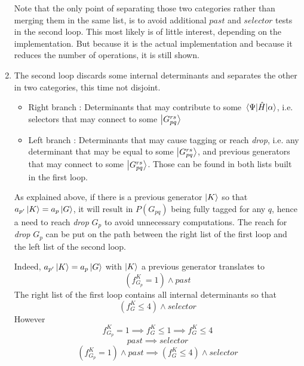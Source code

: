 \documentclass[./thesis.tex]{subfiles}
\begin{document}
\begin{enumerate}
Note that the only point of separating those two categories rather than merging them in the same list, is to avoid additional $past$ and $selector$ tests in the second loop.
This most likely is of little interest, depending on the implementation.
But because it is the actual implementation and because it reduces the number of operations, it is still shown.

\item
The second loop discards some internal determinants and separates the other in two categories, this time not disjoint.

\begin{itemize}
\item
Right branch : Determinants that may contribute to some $\mel{\Psi}{\hat{H}}{\alpha}$, i.e. selectors that may connect to some $\ket {G_{pq}^{rs}}$
\item
Left branch : Determinants that may cause tagging or reach \emph{drop}, i.e. any determinant that may be equal to some $\ket {G_{pq}^{rs}}$, and previous generators that may connect to some $\ket {G_{pq}^{rs}}$. Those can be found in both lists built in the first loop.
\end{itemize}

As explained above, if there is a previous generator $\ket K$ so that $a_{p'} \ket K = a_p \ket G$, it will result in $P(G_{pq})$ being fully tagged for any $q$, hence a need to reach \emph{drop} $G_p$ to avoid unnecessary computations.
The reach for \emph{drop} $G_p$ can be put on the path between the right list of the first loop and the left list of the second loop.

Indeed, $a_{p'} \ket K = a_p \ket G$ with $\ket K$ a previous generator translates to
\begin{equation}
(f^K_{G_{p}} = 1) \wedge past
\end{equation}
The right list of the first loop contains all internal determinants so that
\begin{equation}
(f^K_G \leq 4) \wedge selector
\end{equation}
However 
\begin{equation}
f^K_{G_{p}} = 1 \implies f^K_G \leq 1 \implies f^K_G \leq 4
\end{equation}
\begin{equation}
past \implies selector
\end{equation}
\begin{equation}
(f^K_{G_{p}} = 1) \wedge past \implies (f^K_G \leq 4) \wedge selector
\end{equation}


\end{enumerate}
\end{document}
